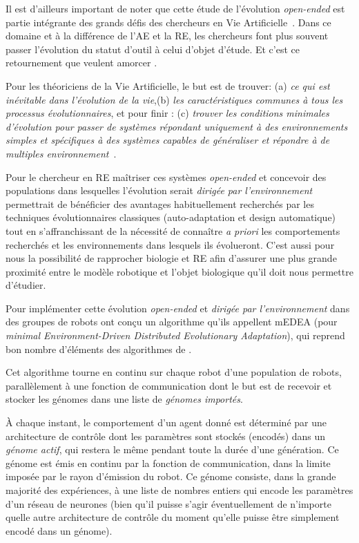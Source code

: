 Il est d'ailleurs important de noter que cette étude de l'évolution \emph{open-ended} est partie intégrante des grands défis des chercheurs en Vie Artificielle~\citep{bedau2000openproblemsinartificiallife}. Dans ce domaine et à la différence de l'AE et la RE, les chercheurs font plus souvent passer l'évolution du statut d'outil à celui d'objet d'étude. Et c'est ce retournement que veulent amorcer \cite{bredeche11mcmds}.

Pour les théoriciens de la Vie Artificielle, le but est de trouver: (a) \emph{ce qui est inévitable dans l'évolution de la vie},(b) \emph{les caractéristiques communes à tous les processus évolutionnaires}, et pour finir : (c) \emph{trouver les conditions minimales d'évolution pour passer de systèmes répondant uniquement à des environnements simples et spécifiques à des systèmes capables de généraliser et répondre à de multiples environnement}~\citep[voir respectivement les chapitres 3.6, 3.10 et 3.7 ]{bedau2000openproblemsinartificiallife}.

Pour le chercheur en RE maîtriser ces systèmes \emph{open-ended} et concevoir des populations dans lesquelles l'évolution serait \emph{dirigée par l'environnement} permettrait de bénéficier des avantages habituellement recherchés par les techniques évolutionnaires classiques (auto-adaptation et design automatique) tout en s'affranchissant de la nécessité de connaître \emph{a priori} les comportements recherchés et les environnements dans lesquels ils évolueront. C'est aussi pour nous la possibilité de rapprocher biologie et RE afin d'assurer une plus grande proximité entre le modèle robotique et l'objet biologique qu'il doit nous permettre d'étudier.

Pour implémenter cette évolution \emph{open-ended} et \emph{dirigée par l'environnement} dans des groupes de robots \cite{bredeche11mcmds} ont conçu un algorithme qu'ils appellent mEDEA (pour \emph{minimal Environment-Driven Distributed Evolutionary Adaptation}), qui reprend bon nombre d'éléments des algorithmes de \cite{watson02embodiedevolutiondistributingevolutionaryalgorithmpopulationrobots}.

Cet algorithme tourne en continu sur chaque robot d'une population de robots, parallèlement à une fonction de communication dont le but est de recevoir et stocker les génomes dans une liste de \emph{génomes importés}.

À chaque instant, le comportement d'un agent donné est déterminé par une architecture de contrôle dont les paramètres sont stockés (encodés) dans un \emph{génome actif}, qui restera le même pendant toute la durée d'une génération. Ce génome est émis en continu par la fonction de communication, dans la limite imposée par le rayon d'émission du robot. Ce génome consiste, dans la grande majorité des expériences, à une liste de nombres entiers qui encode les paramètres d'un réseau de neurones (bien qu'il puisse s'agir éventuellement de n'importe quelle autre architecture de contrôle du moment qu'elle puisse être simplement encodé dans un génome).

